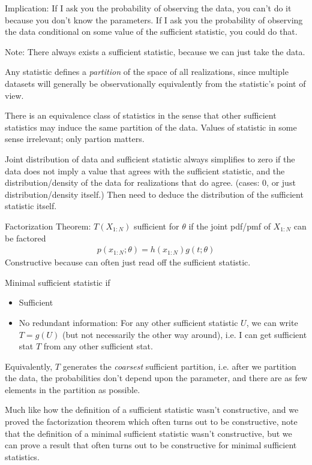 \documentclass[12pt]{article}
\theoremstyle{plain}
\theoremstyle{definition}
\theoremstyle{remark}
\begin{document}
Implication: If I ask you the probability of observing the data, you
can't do it because you don't know the parameters.
If I ask you the probability of observing the data conditional on some
value of the sufficient statistic, you could do that.

Note: There always exists a sufficient statistic, because we can just
take the data.

Any statistic defines a \emph{partition} of the space of all
realizations, since multiple datasets will generally be observationally
equivalently from the statistic's point of view.

There is an equivalence class of statistics in the sense that other
sufficient statistics may induce the same partition of the data.
Values of statistic in some sense irrelevant; only partion matters.

Joint distribution of data and sufficient statistic always simplifies to
zero if the data does not imply a value that agrees with the sufficient
statistic, and the distribution/density of the data for realizations
that do agree. (cases: 0, or just distribution/density itself.)
Then need to deduce the distribution of the sufficient statistic itself.

Factorization Theorem:
$T(X_{1:N})$ sufficient for $\theta$ if the joint pdf/pmf of $X_{1:N}$
can be factored
\begin{align*}
  p(x_{1:N};\theta)
  =
  h(x_{1:N})
  g(t;\theta)
\end{align*}
Constructive because can often just read off the sufficient statistic.

Minimal sufficient statistic if
\begin{itemize}
  \item Sufficient
  \item No redundant information:
    For any other sufficient statistic $U$, we can write $T=g(U)$ (but
    not necessarily the other way around), i.e. I can get sufficient
    stat $T$ from any other sufficient stat.
\end{itemize}
Equivalently, $T$ generates the \emph{coarsest} sufficient partition,
i.e. after we partition the data, the probabilities don't depend upon
the parameter, and there are as few elements in the partition as
possible.

Much like how the definition of a sufficient statistic wasn't
constructive, and we proved the factorization theorem which often turns
out to be constructive, note that the definition of a minimal sufficient
statistic wasn't constructive, but we can prove a result that often
turns out to be constructive for minimal sufficient statistics.
\end{document}
